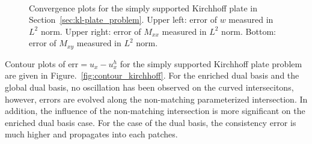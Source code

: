 \begin{figure}[ht]
	\center
	\captionsetup[subfigure]{labelformat=empty}
	\begin{subfigure}{.45\linewidth}
		\center
		
	\end{subfigure}\hspace{2mm}
	\begin{subfigure}{.45\linewidth}
		\center
		
	\end{subfigure}\\
	\begin{subfigure}{.45\linewidth}
		\center
		
	\end{subfigure}
	\caption{Convergence plots for the simply supported Kirchhoff plate in Section~\ref{sec:kl-plate_problem}. Upper left: error of $w$ measured in $L^2$ norm. Upper right: error of $M_{xx}$ measured in $L^2$ norm. Bottom: error of $M_{xy}$ measured in $L^2$ norm.}\label{fig:convergence_kirchhoff}
\end{figure}

Contour plots of $\text{err}=u_x-u_x^h$ for the simply supported Kirchhoff plate problem are given in Figure.~\ref{fig:contour_kirchhoff}. For the enriched dual basis and the global dual basis, no oscillation has been observed on the curved intersecitons, however, errors are evolved along the non-matching parameterized intersection. In addition, the influence of the non-matching intersection is more significant on the enriched dual basis case. For the case of the \Bezier dual basis, the consistency error is much higher and propagates into each patches.

